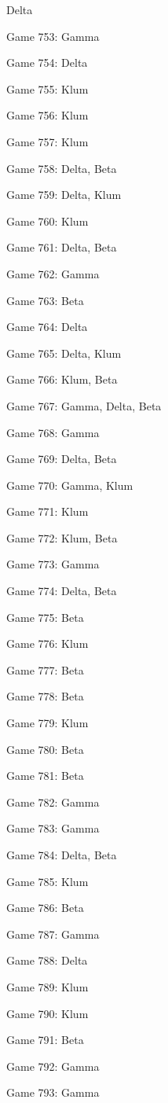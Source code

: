 \documentclass{article}
\begin{document}
\begin{multicols}{3}
\begin{compactitem}
Delta
\item Game 753:
Gamma
\item Game 754:
Delta
\item Game 755:
Klum
\item Game 756:
Klum
\item Game 757:
Klum
\item Game 758:
Delta, Beta
\item Game 759:
Delta, Klum
\item Game 760:
Klum
\item Game 761:
Delta, Beta
\item Game 762:
Gamma
\item Game 763:
Beta
\item Game 764:
Delta
\item Game 765:
Delta, Klum
\item Game 766:
Klum, Beta
\item Game 767:
Gamma, Delta, Beta
\item Game 768:
Gamma
\item Game 769:
Delta, Beta
\item Game 770:
Gamma, Klum
\item Game 771:
Klum
\item Game 772:
Klum, Beta
\item Game 773:
Gamma
\item Game 774:
Delta, Beta
\item Game 775:
Beta
\item Game 776:
Klum
\item Game 777:
Beta
\item Game 778:
Beta
\item Game 779:
Klum
\item Game 780:
Beta
\item Game 781:
Beta
\item Game 782:
Gamma
\item Game 783:
Gamma
\item Game 784:
Delta, Beta
\item Game 785:
Klum
\item Game 786:
Beta
\item Game 787:
Gamma
\item Game 788:
Delta
\item Game 789:
Klum
\item Game 790:
Klum
\item Game 791:
Beta
\item Game 792:
Gamma
\item Game 793:
Gamma

\end{compactitem}
\end{multicols}
\end{document}
